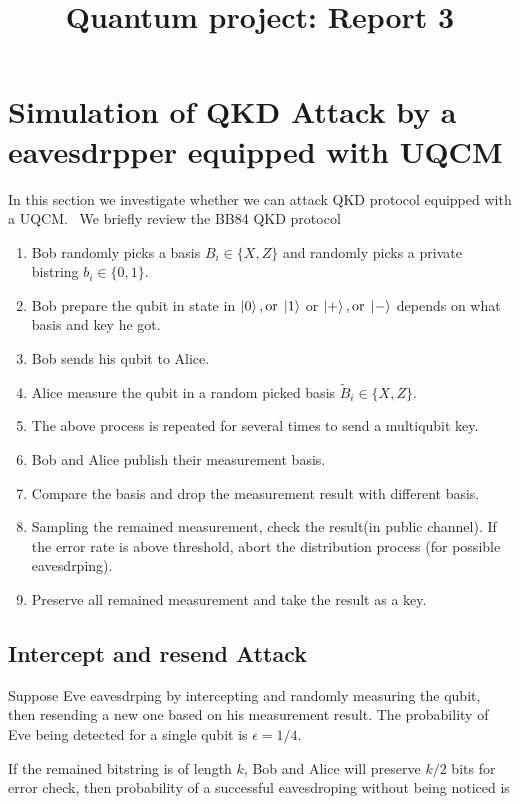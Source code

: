 \documentclass[11pt]{article}
\title{Quantum project: Report 3}
\author{}
\begin{document}
\maketitle




\section{Simulation of QKD Attack by a eavesdrpper equipped with UQCM}
In this section we investigate whether we can attack QKD protocol equipped with a UQCM.
\
We briefly review the BB84 QKD protocol\cite{bennett2020quantum} 
\begin{enumerate}
    \item Bob randomly picks a basis $B_i\in \{X,Z\}$ and randomly picks a private bistring $b_i\in \{0,1\}$.
    \item Bob prepare the qubit in state in $\ket{0}, \text{or} \; \ket{1}$ or $\ket{+}, \text{or} \; \ket{-}$ depends on what basis and key he got.
    \item Bob sends his qubit to Alice.
    \item Alice measure the qubit in a random picked basis $\tilde{B}_i\in \{X,Z\}$.
    \item The above process is repeated for several times to send a multiqubit key.
    \item Bob and Alice publish their measurement basis.
    \item Compare the basis and drop the measurement result with different basis.
    \item Sampling the remained measurement, check the result(in public channel). If the error rate is above threshold, abort the distribution process (for possible eavesdrping). 
    \item Preserve all remained measurement and take the result as a key.
\end{enumerate}

\subsection{Intercept and resend Attack} 
Suppose Eve eavesdrping by intercepting and randomly measuring the qubit, then resending a new one based on his measurement result.
The probability of Eve being detected for a single qubit is $\epsilon=1/4$. 

If the remained bitstring is of length $k$, Bob and Alice will preserve $k/2$ bits for error check,
 then probability of a successful eavesdroping without being noticed is
\end{document}
